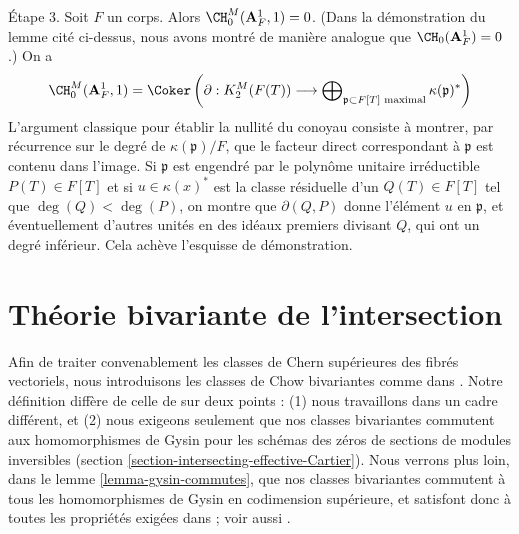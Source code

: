 \begin{remark}
\medskip\noindent
Étape 3. Soit $F$ un corps. Alors $\CH^M_0(\mathbf{A}^1_F, 1) = 0$.
(Dans la démonstration du lemme cité ci-dessus, nous avons montré de manière analogue que
$\CH_0(\mathbf{A}^1_F) = 0$.) On a
$$
\CH^M_0(\mathbf{A}^1_F, 1) = \Coker\left(
\partial : K^M_2(F(T)) \longrightarrow
\bigoplus\nolimits_{\mathfrak p \subset F[T]\text{ maximal}}
\kappa(\mathfrak p)^*\right)
$$
L'argument classique pour établir la nullité du conoyau consiste à
montrer, par récurrence sur le degré de $\kappa(\mathfrak p)/F$,
que le facteur direct correspondant à $\mathfrak p$ est contenu dans l'image.
Si $\mathfrak p$ est engendré par le
polynôme unitaire irréductible $P(T) \in F[T]$ et si
$u \in \kappa(x)^*$ est la classe résiduelle d'un
$Q(T) \in F[T]$ tel que $\deg(Q) < \deg(P)$, on montre que
$\partial(Q, P)$ donne l'élément $u$ en $\mathfrak p$,
et éventuellement d'autres unités en des idéaux premiers divisant $Q$, qui
ont un degré inférieur. Cela achève l'esquisse de démonstration.
\end{remark}











\section{Théorie bivariante de l'intersection}
\label{section-bivariant}

\noindent
Afin de traiter convenablement les classes de Chern supérieures des fibrés
vectoriels, nous introduisons les classes de Chow bivariantes comme dans \cite{F}.
Notre définition diffère de celle de \cite{F} sur deux points :
(1) nous travaillons dans un cadre différent, et (2) nous exigeons seulement
que nos classes bivariantes commutent aux homomorphismes de Gysin pour
les schémas des zéros de sections de modules inversibles
(section \ref{section-intersecting-effective-Cartier}).
Nous verrons plus loin, dans le lemme \ref{lemma-gysin-commutes}, que nos
classes bivariantes commutent à tous les homomorphismes de Gysin en codimension supérieure,
et satisfont donc à toutes les propriétés exigées dans \cite{F} ; voir
aussi \cite[Théorème 17.1]{F}.

